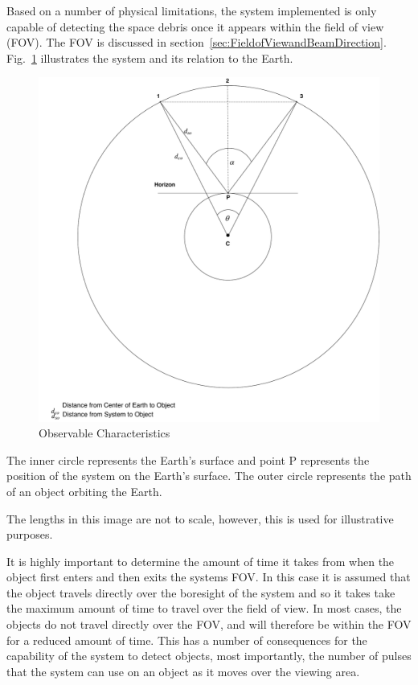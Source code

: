 \documentclass[11pt]{witseiepaper}
\begin{document}
\begin{bibunit}[witseie]
Based on a number of physical limitations, the system implemented is only capable of detecting the space debris once it appears within the field of view (FOV). The FOV is discussed in section~\ref{sec:FieldofViewandBeamDirection}. Fig.~\ref{fig:ObservableCharacteristics} illustrates the system and its relation to the Earth.


\begin{figure}[htb]
    \centering
    \includegraphics[width=0.85\linewidth]{ObservableCharacteristics.pdf}
    \caption{Observable Characteristics}
    \label{fig:ObservableCharacteristics}
\end{figure}


The inner circle represents the Earth's surface and point P represents the position of the system on the Earth's surface.  
The outer circle represents the path of an object orbiting the Earth.

The lengths in this image are not to scale, however, this is used for illustrative purposes.

It is highly important to determine the amount of time it takes from when the object first enters and then exits the systems FOV.
In this case it is assumed that the object travels directly over the boresight of the system and so it takes take the maximum amount of time to travel over the field of view. In most cases, the objects do not travel directly over the FOV, and will therefore be within the FOV for a reduced amount of time. This has a number of consequences for the capability of the system to detect objects, most importantly, the number of pulses that the system can use on an object as it moves over the viewing area.


\end{bibunit}
\end{document}
